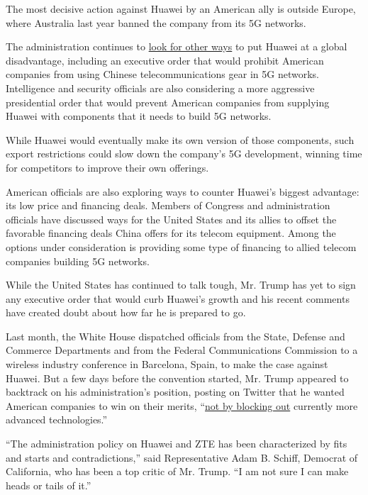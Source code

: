The most decisive action against Huawei by an American ally is outside
Europe, where Australia last year banned the company from its 5G
networks.

The administration continues to
\href{https://www.nytimes.com/2019/02/12/us/politics/trump-china-wireless-networks.html}{look
for other ways} to put Huawei at a global disadvantage, including an
executive order that would prohibit American companies from using
Chinese telecommunications gear in 5G networks. Intelligence and
security officials are also considering a more aggressive presidential
order that would prevent American companies from supplying Huawei with
components that it needs to build 5G networks.

While Huawei would eventually make its own version of those components,
such export restrictions could slow down the company's 5G development,
winning time for competitors to improve their own offerings.

American officials are also exploring ways to counter Huawei's biggest
advantage: its low price and financing deals. Members of Congress and
administration officials have discussed ways for the United States and
its allies to offset the favorable financing deals China offers for its
telecom equipment. Among the options under consideration is providing
some type of financing to allied telecom companies building 5G networks.

While the United States has continued to talk tough, Mr. Trump has yet
to sign any executive order that would curb Huawei's growth and his
recent comments have created doubt about how far he is prepared to go.

Last month, the White House dispatched officials from the State, Defense
and Commerce Departments and from the Federal Communications Commission
to a wireless industry conference in Barcelona, Spain, to make the case
against Huawei. But a few days before the convention started, Mr. Trump
appeared to backtrack on his administration's position, posting on
Twitter that he wanted American companies to win on their merits,
``\href{https://twitter.com/realDonaldTrump/status/1098583029713420288?ref_src=twsrc\%5Etfw\%7Ctwcamp\%5Etweetembed\&ref_url=https\%3A\%2F\%2Fwww.cnbc.com\%2F2019\%2F02\%2F21\%2Ftrump-sends-bizarre-6g-tweet-as-china-trade-talks-resume.html}{not
by blocking out} currently more advanced technologies.''

``The administration policy on Huawei and ZTE has been characterized by
fits and starts and contradictions,'' said Representative Adam B.
Schiff, Democrat of California, who has been a top critic of Mr. Trump.
``I am not sure I can make heads or tails of it.''

